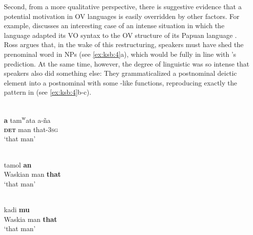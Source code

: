 \documentclass[output=paper]{langsci/langscibook}
\begin{document}
Second, from a more qualitative perspective, there is suggestive evidence that a potential  motivation in OV languages is easily overridden by other factors. For example, \citet{Ross2001_Contact} discusses an interesting case of an intense  situation in which the  language  adapted its VO syntax to the OV structure of its Papuan  language . Ross argues that, in the wake of this restructuring,  speakers must have shed the prenominal  word in NPs (see \ref{ex:ksb:4}a), which would be fully in line with ’s prediction. At the same time, however, the degree of linguistic  was so intense that  speakers also did something else: They grammaticalized a postnominal deictic element into a postnominal  with some -like functions, reproducing exactly the  pattern in  (see \ref{ex:ksb:4}b-c).

\ea\label{ex:ksb:4} 
  \ea
  \\
  \gll \textbf{a}   tam\textsuperscript{w}ata   a-ña\\
      \textbf{\textsc{det}}   man   that-3\textsc{sg}\\
  \glt ‘that man’

  \ex 
  \\
     tamol  \textbf{an}\\
      Waskian   man   \textbf{that}\\
  \glt ‘that  man’

  \ex
  \\
     kadi   \textbf{mu}\\
       {Waskia}   man   \textbf{that}\\
  \glt ‘that  man’
  \z
\z
\end{document}

